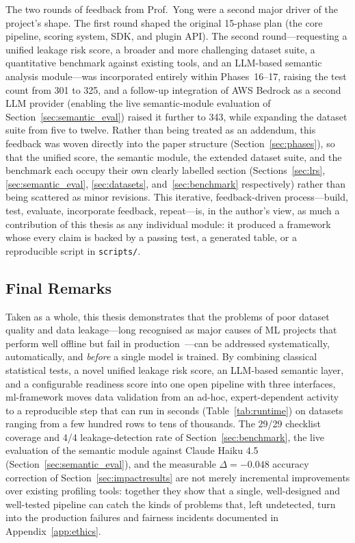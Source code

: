\documentclass[12pt,a4paper]{report}
\begin{document}
The two rounds of feedback from Prof.\ Yong were a second major driver of the project's
shape.  The first round shaped the original 15-phase plan (the core pipeline, scoring system,
SDK, and plugin API).  The second round---requesting a unified leakage risk score, a broader
and more challenging dataset suite, a quantitative benchmark against existing tools, and an
LLM-based semantic analysis module---was incorporated entirely within Phases~16--17, raising
the test count from 301 to 325, and a follow-up integration of AWS Bedrock as a second LLM
provider (enabling the live semantic-module evaluation of
Section~\ref{sec:semantic_eval}) raised it further to 343, while expanding the dataset suite
from five to twelve.  Rather
than being treated as an addendum, this feedback was woven directly into the paper structure
(Section~\ref{sec:phases}), so that the unified score, the semantic module, the extended
dataset suite, and the benchmark each occupy their own clearly labelled section
(Sections~\ref{sec:lrs}, \ref{sec:semantic_eval}, \ref{sec:datasets}, and~\ref{sec:benchmark}
respectively) rather than being scattered as minor revisions.  This iterative,
feedback-driven process---build, test, evaluate, incorporate feedback, repeat---is, in the
author's view, as much a contribution of this thesis as any individual module: it produced a
framework whose every claim is backed by a passing test, a generated table, or a reproducible
script in \texttt{scripts/}.

\subsection{Final Remarks}

Taken as a whole, this thesis demonstrates that the problems of poor dataset quality and data
leakage---long recognised as major causes of ML projects that perform well offline but fail
in production~\cite{sculley2015,breck2019,kaufman2012leakage}---can be addressed systematically,
automatically, and \emph{before} a single model is trained.  By combining classical
statistical tests, a novel unified leakage risk score, an LLM-based semantic layer, and a
configurable readiness score into one open pipeline with three interfaces, ml-framework moves
data validation from an ad-hoc, expert-dependent activity to a reproducible step that can run
in seconds (Table~\ref{tab:runtime}) on datasets ranging from a few hundred rows to tens of
thousands.  The 29/29 checklist coverage and 4/4 leakage-detection rate of
Section~\ref{sec:benchmark}, the live evaluation of the semantic module against Claude
Haiku 4.5 (Section~\ref{sec:semantic_eval}), and the measurable
$\Delta{=}{-}0.048$ accuracy correction of Section~\ref{sec:impactresults} are not merely
incremental improvements over existing profiling tools: together they show that a single,
well-designed and well-tested pipeline can catch the kinds of problems that, left
undetected, turn into the production failures and fairness incidents documented in
Appendix~\ref{app:ethics}.
\end{document}
